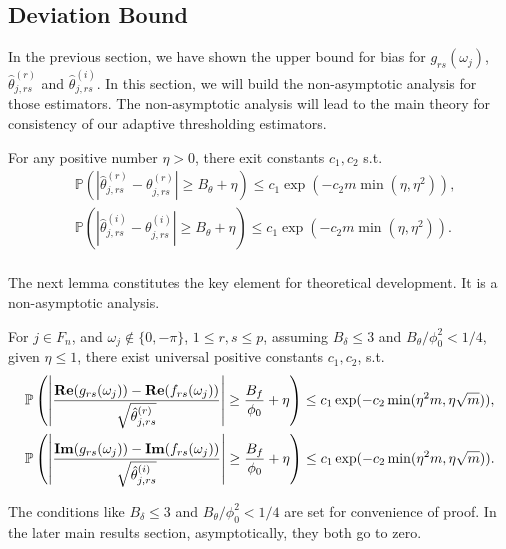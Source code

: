 \subsection{Deviation Bound} 
In the previous section,  we have shown the upper bound for bias for $g_{rs}(\omega_j)$, $\hat{\theta}^{(r)}_{j, rs}$ and $\hat{\theta}^{(i)}_{j, rs}$. In this section, we will build the non-asymptotic analysis for those estimators. The non-asymptotic analysis will lead to the
main theory for consistency of our adaptive thresholding estimators. 


\begin{lem}
\label{lemma: deviation_variance}
For any positive number $\eta>0$, there exit constants $c_1, c_2$ s.t.
\begin{equation}
\begin{aligned}
& \mathbb{P}\left(\left|\hat{\theta}^{(r)}_{j, rs} - \theta^{(r)}_{j, rs}\right|\ge  
B_\theta + \eta \right) \le  c_1\exp(-c_2m\min\left(\eta, \eta^2\right)), \\ 
& \mathbb{P}\left(\left|\hat{\theta}^{(i)}_{j, rs} - \theta^{(i)}_{j, rs}\right|\ge  
B_\theta + \eta \right) \le  c_1\exp(-c_2m\min\left(\eta, \eta^2\right)).\\ 
\end{aligned}
\end{equation}
\end{lem}
The next lemma constitutes the key element for theoretical development. It is a non-asymptotic analysis. 
\begin{lem}
For $j\in F_n$, and $\omega_j \notin \{0, -\pi\}$,  $1\le r, s\le p$, 
assuming $B_\delta\le 3$ and $B_\theta/\phi_0^2<1/4$, given $\eta\le 1$, there exist universal positive constants $c_1, c_2$, s.t. 
\begin{equation}
\begin{aligned}
& \mathbb{P}\left(\left|\frac{{\bf Re}(g_{rs}(\omega_j)) - {\bf Re}(f_{rs}(\omega_j))}{\sqrt{\hat{\theta}^{(r)}_{j,rs}}}\right| \ge \frac{B_f}{\phi_0}+\eta\right)\le c_1\exp(-c_2\min(\eta^2 m, \eta \sqrt{m})),\\
& \mathbb{P}\left(\left|\frac{{\bf Im}(g_{rs}(\omega_j)) - {\bf Im}(f_{rs}(\omega_j))}{\sqrt{\hat{\theta}^{(i)}_{j,rs}}}\right| \ge \frac{B_f}{\phi_0}+\eta\right)\le c_1\exp(-c_2\min(\eta^2 m, \eta \sqrt{m})).
\end{aligned}
\end{equation}
\end{lem}
\begin{remark}
The conditions like $B_\delta\le 3$ and $B_\theta/\phi_0^2<1/4$ are set for convenience of proof. In the later main results section, asymptotically, they both go to zero. 
\end{remark}

